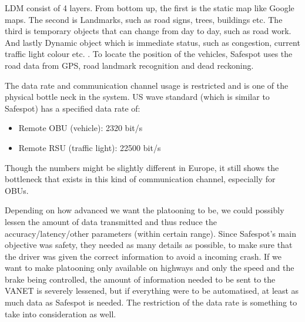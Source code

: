 \acrshort{LDM} consist of 4 layers. From bottom up, the first is the static map like Google maps. The second is Landmarks, such as road signs, trees, buildings etc. The third is temporary objects that can change from day to day, such as road work. And lastly Dynamic object which is immediate status, such as congestion, current traffic light colour etc. \cite{Brignolo2008UseProject}.
To locate the position of the vehicles, Safespot uses the road data from \acrshort{GPS}, road landmark recognition and dead reckoning\footnotemark.\par
%
% 
% 
% 
The data rate and communication channel usage is restricted and is one of the physical bottle neck in the system. US \acrshort{wave} standard (which is similar to Safespot) has a specified data rate of:
\begin{itemize}[noitemsep]
    \item Remote \acrfull{OBU} (vehicle): 2320 bit/s
    \item Remote \acrlong{RSU} (traffic light): 22500 bit/s  
\end{itemize}
Though the numbers might be slightly different in Europe, it still shows the bottleneck that exists in this kind of communication channel, especially for \acrshort{OBU}s.\par
% 
Depending on how advanced we want the platooning to be, we could possibly lessen the amount of data transmitted and thus reduce the accuracy/latency/other parameters (within certain range). Since Safespot's main objective was safety, they needed as many details as possible, to make sure that the driver was given the correct information to avoid a incoming crash. If we want to make platooning only available on highways and only the speed and the brake being controlled, the amount of information needed to be sent to the \acrshort{VANET} is severely lessened, but if everything were to be automatised, at least as much data as Safespot is needed. The restriction of the data rate is something to take into consideration as well. 
